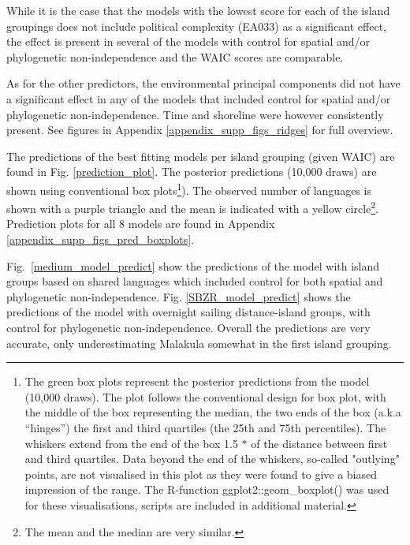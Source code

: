 \documentclass[unnumsec,webpdf,modern,medium]{oup-authoring-template}
\begin{document}
While it is the case that the models with the lowest score for each of the island groupings does not include political complexity (EA033) as a significant effect, the effect is present in several of the models with control for spatial and/or phylogenetic non-independence and the WAIC scores are comparable.

As for the other predictors, the environmental principal components did not have a significant effect in any of the models that included control for spatial and/or phylogenetic non-independence. Time and shoreline were however consistently present. See figures in Appendix \ref{appendix_supp_figs_ridges} for full overview.

The predictions of the best fitting models per island grouping (given WAIC) are found in Fig. \ref{prediction_plot}. The posterior predictions (10,000 draws) are shown using conventional box plots\footnote{The green box plots represent the posterior predictions from the model (10,000 draws). The plot follows the conventional design for box plot, with the middle of the box representing the median, the two ends of the box (a.k.a ``hinges'') the first and third quartiles (the 25th and 75th percentiles). The whiskers extend from the end of the box 1.5 $\ast$  of the distance between first and third quartiles. Data beyond the end of the whiskers, so-called "outlying" points, are not visualised in this plot as they were found to give a biased impression of the range. The R-function  ggplot2::geom\_boxplot() was used for these visualisations, scripts are included in additional material.}). The observed number of languages is shown with a purple triangle and the mean is indicated with a yellow circle\footnote{The mean and the median are very similar.}. Prediction plots for all 8 models are found in Appendix \ref{appendix_supp_figs_pred_boxplots}.

Fig.~\ref{medium_model_predict} show the predictions of the model with island groups based on shared languages which included control for both spatial and phylogenetic non-independence. Fig. \ref{SBZR_model_predict} shows the predictions of the model with overnight sailing distance-island groups, with control for phylogenetic non-independence. Overall the predictions are very accurate, only underestimating Malakula somewhat in the first island grouping.

\end{document}
